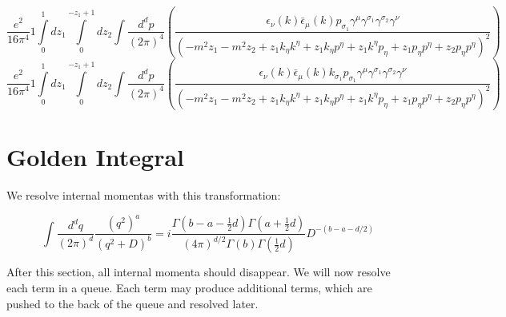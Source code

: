 \begin{dmath}\frac{e^{2}}{16 \pi^{4}}1\int\limits_{ 0 }^{ 1 } d{ z_{ 1 } }\int\limits_{ 0 }^{ - { z_{ 1 } } + 1 } d{ z_{ 2 } }\int\frac{d^d p }{ (2\pi)^4 }\left(\frac{\epsilon_{ \nu }({ k }) \bar{\epsilon}_{ \mu }({ k }) { { p }_{ \sigma_1 } } { \gamma^{ \mu } } { \gamma^{ \sigma_1 } } { \gamma^{ \sigma_2 } } { \gamma^{ \nu } }}{\left(- m^{2} { z_{ 1 } } - m^{2} { z_{ 2 } } + { z_{ 1 } } { { k }_{ \eta } } { { k }^{ \eta } } + { z_{ 1 } } { { k }_{ \eta } } { { p }^{ \eta } } + { z_{ 1 } } { { k }^{ \eta } } { { p }_{ \eta } } + { z_{ 1 } } { { p }_{ \eta } } { { p }^{ \eta } } + { z_{ 2 } } { { p }_{ \eta } } { { p }^{ \eta } }\right)^{2}}\right)\end{dmath}
\begin{dmath}\frac{e^{2}}{16 \pi^{4}}1\int\limits_{ 0 }^{ 1 } d{ z_{ 1 } }\int\limits_{ 0 }^{ - { z_{ 1 } } + 1 } d{ z_{ 2 } }\int\frac{d^d p }{ (2\pi)^4 }\left(\frac{\epsilon_{ \nu }({ k }) \bar{\epsilon}_{ \mu }({ k }) { { k }_{ \sigma_1 } } { { p }_{ \sigma_1 } } { \gamma^{ \mu } } { \gamma^{ \sigma_1 } } { \gamma^{ \sigma_2 } } { \gamma^{ \nu } }}{\left(- m^{2} { z_{ 1 } } - m^{2} { z_{ 2 } } + { z_{ 1 } } { { k }_{ \eta } } { { k }^{ \eta } } + { z_{ 1 } } { { k }_{ \eta } } { { p }^{ \eta } } + { z_{ 1 } } { { k }^{ \eta } } { { p }_{ \eta } } + { z_{ 1 } } { { p }_{ \eta } } { { p }^{ \eta } } + { z_{ 2 } } { { p }_{ \eta } } { { p }^{ \eta } }\right)^{2}}\right)\end{dmath}
\section*{{Golden Integral}}
We resolve internal momentas with this transformation:

    $$\int \frac{d^d q}{(2 \pi)^d} \frac{(q^2)^a}{(q^2 + D)^b} = i \frac{\Gamma (b-a-\frac{1}{2}d) \Gamma (a + \frac{1}{2} d)}{(4 \pi)^{d/2} \Gamma(b) \Gamma(\frac{1}{2}d)} D^{-(b-a-d/2)}$$
    
After this section, all internal momenta should disappear.  We will now resolve each term in a queue.  Each term may produce additional terms, which are pushed to the back of the queue and resolved later.
